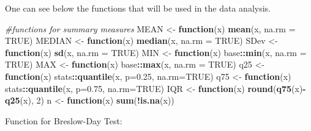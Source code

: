 \documentclass[
]{article}
\newenvironment{Shaded}{\begin{snugshade}}{\end{snugshade}}
\newcommand{\CommentTok}[1]{\textcolor[rgb]{0.56,0.35,0.01}{\textit{#1}}}
\newcommand{\ControlFlowTok}[1]{\textcolor[rgb]{0.13,0.29,0.53}{\textbf{#1}}}
\newcommand{\DataTypeTok}[1]{\textcolor[rgb]{0.13,0.29,0.53}{#1}}
\newcommand{\DecValTok}[1]{\textcolor[rgb]{0.00,0.00,0.81}{#1}}
\newcommand{\FloatTok}[1]{\textcolor[rgb]{0.00,0.00,0.81}{#1}}
\newcommand{\KeywordTok}[1]{\textcolor[rgb]{0.13,0.29,0.53}{\textbf{#1}}}
\newcommand{\NormalTok}[1]{#1}
\newcommand{\OperatorTok}[1]{\textcolor[rgb]{0.81,0.36,0.00}{\textbf{#1}}}
\newcommand{\OtherTok}[1]{\textcolor[rgb]{0.56,0.35,0.01}{#1}}
\newcommand{\StringTok}[1]{\textcolor[rgb]{0.31,0.60,0.02}{#1}}
\begin{document}
One can see below the functions that will be used in the data analysis.

\begin{Shaded}
\begin{Highlighting}[]
\CommentTok{#functions for summary measures}
\NormalTok{MEAN <-}\StringTok{ }\ControlFlowTok{function}\NormalTok{(x) }\KeywordTok{mean}\NormalTok{(x, }\DataTypeTok{na.rm =} \OtherTok{TRUE}\NormalTok{)}
\NormalTok{MEDIAN <-}\StringTok{ }\ControlFlowTok{function}\NormalTok{(x) }\KeywordTok{median}\NormalTok{(x, }\DataTypeTok{na.rm =} \OtherTok{TRUE}\NormalTok{)}
\NormalTok{SDev <-}\StringTok{ }\ControlFlowTok{function}\NormalTok{(x) }\KeywordTok{sd}\NormalTok{(x, }\DataTypeTok{na.rm =} \OtherTok{TRUE}\NormalTok{)}
\NormalTok{MIN <-}\StringTok{ }\ControlFlowTok{function}\NormalTok{(x) base}\OperatorTok{::}\KeywordTok{min}\NormalTok{(x, }\DataTypeTok{na.rm =} \OtherTok{TRUE}\NormalTok{)}
\NormalTok{MAX <-}\StringTok{ }\ControlFlowTok{function}\NormalTok{(x) base}\OperatorTok{::}\KeywordTok{max}\NormalTok{(x, }\DataTypeTok{na.rm =} \OtherTok{TRUE}\NormalTok{)}
\NormalTok{q25 <-}\StringTok{ }\ControlFlowTok{function}\NormalTok{(x) stats}\OperatorTok{::}\KeywordTok{quantile}\NormalTok{(x, }\DataTypeTok{p=}\FloatTok{0.25}\NormalTok{, }\DataTypeTok{na.rm=}\OtherTok{TRUE}\NormalTok{)}
\NormalTok{q75 <-}\StringTok{ }\ControlFlowTok{function}\NormalTok{(x) stats}\OperatorTok{::}\KeywordTok{quantile}\NormalTok{(x, }\DataTypeTok{p=}\FloatTok{0.75}\NormalTok{, }\DataTypeTok{na.rm=}\OtherTok{TRUE}\NormalTok{)}
\NormalTok{IQR <-}\StringTok{ }\ControlFlowTok{function}\NormalTok{(x) }\KeywordTok{round}\NormalTok{(}\KeywordTok{q75}\NormalTok{(x)}\OperatorTok{-}\KeywordTok{q25}\NormalTok{(x), }\DecValTok{2}\NormalTok{)}
\NormalTok{n <-}\StringTok{ }\ControlFlowTok{function}\NormalTok{(x)  }\KeywordTok{sum}\NormalTok{(}\OperatorTok{!}\KeywordTok{is.na}\NormalTok{(x))}
\end{Highlighting}
\end{Shaded}

Function for Breslow-Day Test:
\end{document}
